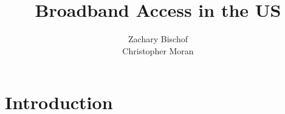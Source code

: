 \documentclass{sig-alternate-10pt}
\begin{document}
\title{Broadband Access in the US}
\author{
Zachary Bischof\\
Christopher Moran
}
  
\maketitle


\begin{abstract}
  

\end{abstract}

\section{Introduction}
\label{sec:intro} 
\end{document}
